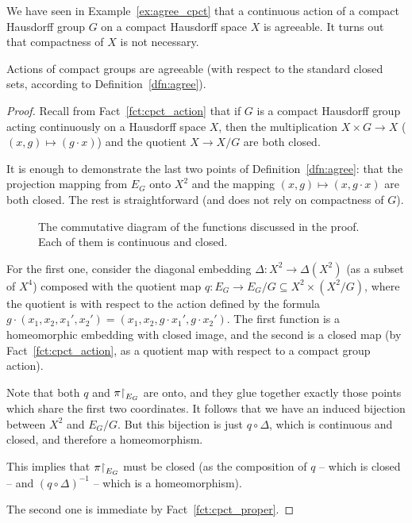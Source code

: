 	We have seen in Example~\ref{ex:agree_cpct} that a continuous action of a compact Hausdorff group $G$ on a compact Hausdorff space $X$ is agreeable. It turns out that compactness of $X$ is not necessary.
	\begin{lem}
		\label{lem:agree_cpct}
		Actions of compact groups are agreeable (with respect to the standard closed sets, according to Definition~\ref{dfn:agree}).
	\end{lem}
	\begin{proof}
		Recall from Fact~\ref{fct:cpct_action} that if $G$ is a compact Hausdorff group acting continuously on a Hausdorff space $X$, then the multiplication $X\times G\to X$ ($(x,g)\mapsto(g\cdot x)$) and the quotient $X\to X/G$ are both closed.
		
		It is enough to demonstrate the last two points of Definition~\ref{dfn:agree}: that the projection mapping from $E_G$ onto $X^2$ and the mapping $(x,g)\mapsto (x,g\cdot x)$ are both closed. The rest is straightforward (and does not rely on compactness of $G$).
		\begin{figure}[H]
			\caption{The commutative diagram of the functions discussed in the proof. Each of them is continuous and closed.}
		\end{figure}
		For the first one, consider the diagonal embedding $\Delta\colon X^2\to \Delta(X^2)$ (as a subset of $X^4$) composed with the quotient map $q\colon E_G\to E_G/G\subseteq X^2\times (X^2/G)$, where the quotient is with respect to the action defined by the formula $g\cdot (x_1,x_2,x_1',x_2')=(x_1,x_2,g\cdot x_1',g\cdot x_2')$. The first function is a homeomorphic embedding with closed image, and the second is a closed map (by Fact~\ref{fct:cpct_action}, as a quotient map with respect to a compact group action).
		
		Note that both $q$ and $\pi\mathord{\upharpoonright}_{E_G}$ are onto, and they glue together exactly those points which share the first two coordinates. It follows that we have an induced bijection between $X^2$ and $E_G/G$. But this bijection is just $q\circ \Delta$, which is continuous and closed, and therefore a homeomorphism.
		
		This implies that $\pi\mathord{\upharpoonright}_{E_G}$ must be closed (as the composition of $q$ -- which is closed -- and $(q\circ \Delta)^{-1}$ -- which is a homeomorphism).
		
		The second one is immediate by Fact~\ref{fct:cpct_proper}.
	\end{proof}
	
